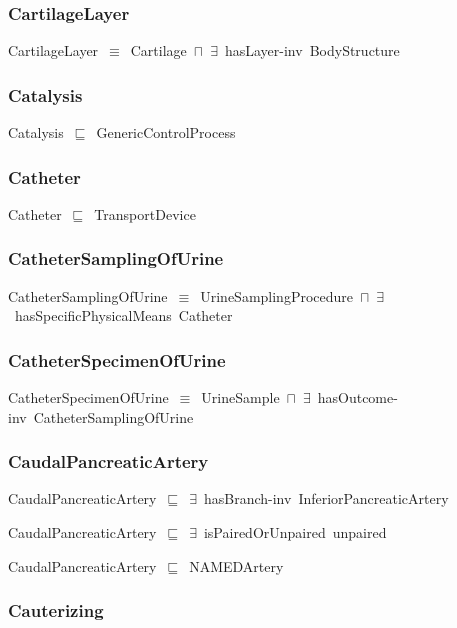 \documentclass{article}
\begin{document}
\subsubsection*{CartilageLayer}

CartilageLayer~\ensuremath{\equiv}~Cartilage~\ensuremath{\sqcap}~\ensuremath{\exists}~hasLayer-inv~BodyStructure

\subsubsection*{Catalysis}

Catalysis~\ensuremath{\sqsubseteq}~GenericControlProcess~

\subsubsection*{Catheter}

Catheter~\ensuremath{\sqsubseteq}~TransportDevice~

\subsubsection*{CatheterSamplingOfUrine}

CatheterSamplingOfUrine~\ensuremath{\equiv}~UrineSamplingProcedure~\ensuremath{\sqcap}~\ensuremath{\exists}~hasSpecificPhysicalMeans~Catheter

\subsubsection*{CatheterSpecimenOfUrine}

CatheterSpecimenOfUrine~\ensuremath{\equiv}~UrineSample~\ensuremath{\sqcap}~\ensuremath{\exists}~hasOutcome-inv~CatheterSamplingOfUrine

\subsubsection*{CaudalPancreaticArtery}

CaudalPancreaticArtery~\ensuremath{\sqsubseteq}~\ensuremath{\exists}~hasBranch-inv~InferiorPancreaticArtery~

CaudalPancreaticArtery~\ensuremath{\sqsubseteq}~\ensuremath{\exists}~isPairedOrUnpaired~unpaired~

CaudalPancreaticArtery~\ensuremath{\sqsubseteq}~NAMEDArtery~

\subsubsection*{Cauterizing}
\end{document}
